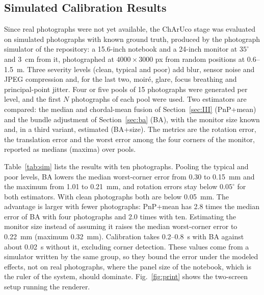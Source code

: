 \documentclass[english,hidelinks]{sbrt}
\begin{document}
\subsection{Simulated Calibration Results}
\label{sec:sim}
Since real photographs were not yet available, the ChArUco stage was evaluated on simulated photographs with known ground truth, produced by the photograph simulator of the repository: a 15.6-inch notebook and a 24-inch monitor at $35^\circ$ and 3~cm from it, photographed at $4000\times3000$ px from random positions at 0.6--1.5~m. Three severity levels (clean, typical and poor) add blur, sensor noise and JPEG compression and, for the last two, moir\'e, glare, focus breathing and principal-point jitter. Four or five pools of 15 photographs were generated per level, and the first $N$ photographs of each pool were used. Two estimators are compared: the median and chordal-mean fusion of Section~\ref{sec:III} (PnP+mean) and the bundle adjustment of Section~\ref{sec:ba} (BA), with the monitor size known and, in a third variant, estimated (BA+size). The metrics are the rotation error, the translation error and the worst error among the four corners of the monitor, reported as medians (maxima) over pools.

Table~\ref{tab:sim} lists the results with ten photographs. Pooling the typical and poor levels, BA lowers the median worst-corner error from 0.30 to 0.15~mm and the maximum from 1.01 to 0.21~mm, and rotation errors stay below $0.05^\circ$ for both estimators. With clean photographs both are below 0.05~mm. The advantage is larger with fewer photographs: PnP+mean has 2.8 times the median error of BA with four photographs and 2.0 times with ten. Estimating the monitor size instead of assuming it raises the median worst-corner error to 0.22~mm (maximum 0.32~mm). Calibration takes 0.2--0.8~s with BA against about 0.02~s without it, excluding corner detection. These values come from a simulator written by the same group, so they bound the error under the modeled effects, not on real photographs, where the panel size of the notebook, which is the ruler of the system, should dominate. Fig.~\ref{fig:print} shows the two-screen setup running the renderer.
\end{document}
